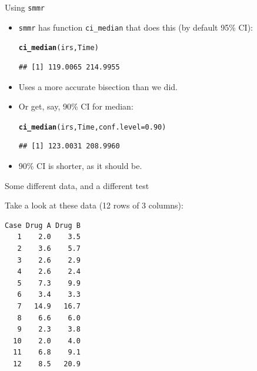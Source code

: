 \documentclass[unknownkeysallowed]{beamer}\usepackage[]{graphicx}\usepackage[]{color}
\makeatletter
\newcommand{\hlnum}[1]{\textcolor[rgb]{0.686,0.059,0.569}{#1}}%
\newcommand{\hlstd}[1]{\textcolor[rgb]{0.345,0.345,0.345}{#1}}%
\newcommand{\hlkwc}[1]{\textcolor[rgb]{0.333,0.667,0.333}{#1}}%
\newcommand{\hlkwd}[1]{\textcolor[rgb]{0.737,0.353,0.396}{\textbf{#1}}}%
\newenvironment{kframe}{%
 \def\at@end@of@kframe{}%
 \ifinner\ifhmode%
  \def\at@end@of@kframe{\end{minipage}}%
  \begin{minipage}{\columnwidth}%
 \fi\fi%
 \def\FrameCommand##1{\hskip\@totalleftmargin \hskip-\fboxsep
 \colorbox{shadecolor}{##1}\hskip-\fboxsep
     \hskip-\linewidth \hskip-\@totalleftmargin \hskip\columnwidth}%
 \MakeFramed {\advance\hsize-\width
   \@totalleftmargin\z@ \linewidth\hsize
   \@setminipage}}%
 {\par\unskip\endMakeFramed%
 \at@end@of@kframe}
\newenvironment{knitrout}{}{} %
\makeatother
\begin{document}
\begin{frame}[fragile]{Using \texttt{smmr}}
  
  \begin{itemize}
  \item \texttt{smmr} has function \texttt{ci\_median} that does this
    (by default 95\% CI):
    
\begin{knitrout}
\color{fgcolor}\begin{kframe}
\begin{alltt}
\hlkwd{ci_median}\hlstd{(irs,Time)}
\end{alltt}
\begin{verbatim}
## [1] 119.0065 214.9955
\end{verbatim}
\end{kframe}
\end{knitrout}

\item Uses a more accurate bisection than we did.

\item Or get, say, 90\% CI for median:
  
\begin{knitrout}
\color{fgcolor}\begin{kframe}
\begin{alltt}
\hlkwd{ci_median}\hlstd{(irs,Time,}\hlkwc{conf.level}\hlstd{=}\hlnum{0.90}\hlstd{)}
\end{alltt}
\begin{verbatim}
## [1] 123.0031 208.9960
\end{verbatim}
\end{kframe}
\end{knitrout}

\item 90\% CI is shorter, as it should be.
  \end{itemize}
  
\end{frame}
 
\begin{frame}[fragile]{Some different data, and a different test}

Take a look at these data (12 rows of 3 columns):

\bigskip

\begin{multicols}{2}
\begin{verbatim}
Case Drug A Drug B
   1    2.0    3.5
   2    3.6    5.7
   3    2.6    2.9
   4    2.6    2.4
   5    7.3    9.9
   6    3.4    3.3
   7   14.9   16.7
   8    6.6    6.0
   9    2.3    3.8
  10    2.0    4.0
  11    6.8    9.1
  12    8.5   20.9
\end{verbatim}
  
\end{multicols}


\end{frame}
\end{document}
